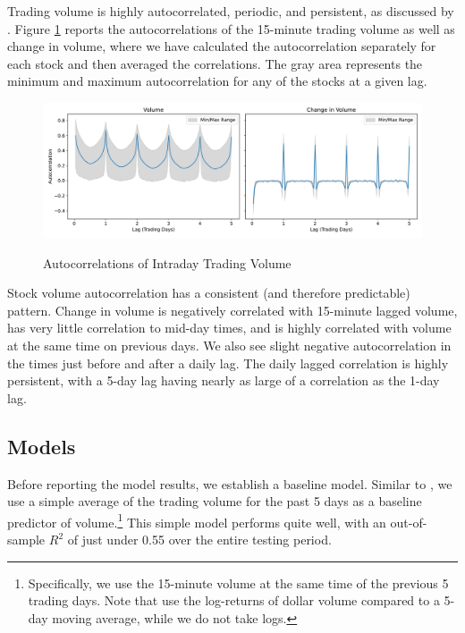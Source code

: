 \documentclass[12pt]{article}
\begin{document}
Trading volume is highly autocorrelated, periodic, and persistent, as discussed by \textcite{brownlees2011intra}. Figure \ref{fig:autocorrelations} reports the autocorrelations of the 15-minute trading volume as well as change in volume, where we have calculated the autocorrelation separately for each stock and then averaged the correlations. The gray area represents the minimum and maximum autocorrelation for any of the stocks at a given lag.

\begin{figure}[H]
    \centering
    \caption{Autocorrelations of Intraday Trading Volume}
    \includegraphics[width=\linewidth]{../Output/Volume Autocorrelations.pdf}
    \label{fig:autocorrelations}
\end{figure}

Stock volume autocorrelation has a consistent (and therefore predictable) pattern. Change in volume is negatively correlated with 15-minute lagged volume, has very little correlation to mid-day times, and is highly correlated with volume at the same time on previous days. We also see slight negative autocorrelation in the times just before and after a daily lag. The daily lagged correlation is highly persistent, with a 5-day lag having nearly as large of a correlation as the 1-day lag. 

\subsection{Models}
Before reporting the model results, we establish a baseline model. Similar to \textcite{goyenko2024trading}, we use a simple average of the trading volume for the past 5 days as a baseline predictor of volume.\footnote{Specifically, we use the 15-minute volume at the same time of the previous 5 trading days. Note that \textcite{goyenko2024trading} use the log-returns of dollar volume compared to a 5-day moving average, while we do not take logs.} This simple model performs quite well, with an out-of-sample $R^2$ of just under 0.55 over the entire testing period.
\end{document}
